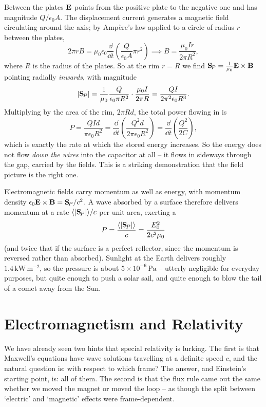\documentclass[a4paper]{scrartcl}
\begin{document}
\begin{example}
	Between the plates $\mathbf{E}$ points from the positive plate to the negative one and has magnitude $Q/\epsilon_0 A$. The displacement current generates a magnetic field circulating around the axis; by Amp\`ere's law applied to a circle of radius $r$ between the plates,
	$$
	2\pi r B = \mu_0 \epsilon_0 \frac{\dd}{\dd t}\left(\frac{Q}{\epsilon_0 A}\pi r^2\right) \implies B = \frac{\mu_0 I r}{2\pi R^2},
	$$
	where $R$ is the radius of the plates. So at the rim $r = R$ we find $\mathbf{S}_{\!P} = \frac{1}{\mu_0}\mathbf{E}\times\mathbf{B}$ pointing radially \emph{inwards}, with magnitude
	$$
	|\mathbf{S}_{\!P}| = \frac{1}{\mu_0}\frac{Q}{\epsilon_0 \pi R^2}\cdot\frac{\mu_0 I}{2\pi R} = \frac{QI}{2\pi^2\epsilon_0 R^3}.
	$$
	Multiplying by the area of the rim, $2\pi R d$, the total power flowing in is
	$$
	P = \frac{QId}{\pi \epsilon_0 R^2} = \frac{\dd}{\dd t}\left(\frac{Q^2 d}{2\pi\epsilon_0 R^2}\right) = \frac{\dd}{\dd t}\left(\frac{Q^2}{2C}\right),
	$$
	which is exactly the rate at which the stored energy increases. So the energy does not flow \emph{down the wires} into the capacitor at all -- it flows in sideways through the gap, carried by the fields. This is a striking demonstration that the field picture is the right one.
\end{example}

\begin{remark}
	Electromagnetic fields carry momentum as well as energy, with momentum density $\epsilon_0 \mathbf{E}\times\mathbf{B} = \mathbf{S}_{\!P}/c^2$. A wave absorbed by a surface therefore delivers momentum at a rate $\langle|\mathbf{S}_{\!P}|\rangle/c$ per unit area, exerting a 
	$$
	P = \frac{\langle|\mathbf{S}_{\!P}|\rangle}{c} = \frac{E_0^2}{2c^2\mu_0}
	$$
	(and twice that if the surface is a perfect reflector, since the momentum is reversed rather than absorbed). Sunlight at the Earth delivers roughly $1.4\,\mathrm{kW}\,\mathrm{m}^{-2}$, so the pressure is about $5\times 10^{-6}\,\mathrm{Pa}$ -- utterly negligible for everyday purposes, but quite enough to push a solar sail, and quite enough to blow the tail of a comet away from the Sun.
\end{remark}

\section{Electromagnetism and Relativity}
\label{sec:relativity}

We have already seen two hints that special relativity is lurking. The first is that Maxwell's equations have wave solutions travelling at a definite speed $c$, and the natural question is: with respect to which frame? The answer, and Einstein's starting point, is: all of them. The second is that the flux rule came out the same whether we moved the magnet or moved the loop -- as though the split between `electric' and `magnetic' effects were frame-dependent.
\end{document}

